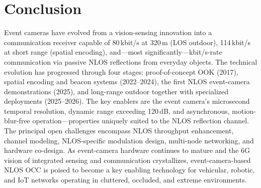 \documentclass[10pt,a4paper]{article}
\begin{document}
\section{Conclusion}
\label{sec:conclusion}

Event cameras have evolved from a vision-sensing innovation into a
communication receiver capable of 80\,kbit/s at 320\,m (LOS outdoor),
114\,kbit/s at short range (spatial encoding), and---most
significantly---kbit/s-rate communication via passive NLOS reflections
from everyday objects. The technical evolution has progressed through
four stages: proof-of-concept OOK (2017), spatial encoding and beacon
systems (2022--2024), the first NLOS event-camera demonstrations (2025),
and long-range outdoor together with specialized deployments
(2025--2026). The key enablers are the event camera's microsecond
temporal resolution, dynamic range exceeding 120\,dB, and asynchronous,
motion-blur-free operation---properties uniquely suited to the NLOS
reflection channel. The principal open challenges encompass NLOS
throughput enhancement, channel modeling, NLOS-specific modulation
design, multi-node networking, and hardware co-design. As event-camera
hardware continues to mature and the 6G vision of integrated sensing and
communication crystallizes, event-camera-based NLOS OCC is poised to
become a key enabling technology for vehicular, robotic, and IoT
networks operating in cluttered, occluded, and extreme environments.



\end{document}
